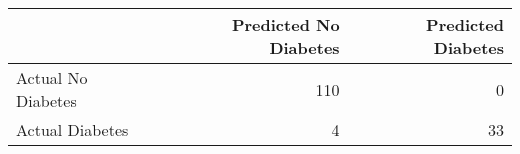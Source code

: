 \begin{tabular}{lrr}
\toprule
 & Predicted No Diabetes & Predicted Diabetes \\
\midrule
Actual No Diabetes & 110 & 0 \\
Actual Diabetes & 4 & 33 \\
\bottomrule
\end{tabular}
